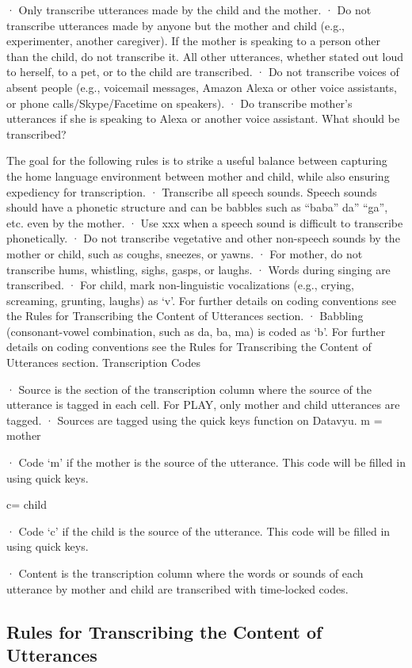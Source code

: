 \documentclass[
]{book}
\begin{document}
· Only transcribe utterances made by the child and the mother.
· Do not transcribe utterances made by anyone but the mother and child (e.g., experimenter, another caregiver). If the mother is speaking to a person other than the child, do not transcribe it. All other utterances, whether stated out loud to herself, to a pet, or to the child are transcribed.
· Do not transcribe voices of absent people (e.g., voicemail messages, Amazon Alexa or other voice assistants, or phone calls/Skype/Facetime on speakers).
· Do transcribe mother's utterances if she is speaking to Alexa or another voice assistant.
What should be transcribed?

The goal for the following rules is to strike a useful balance between capturing the home language environment between mother and child, while also ensuring expediency for transcription.
· Transcribe all speech sounds. Speech sounds should have a phonetic structure and can be babbles such as ``baba'' da'' ``ga'', etc. even by the mother.
· Use xxx when a speech sound is difficult to transcribe phonetically.
· Do not transcribe vegetative and other non-speech sounds by the mother or child, such as coughs, sneezes, or yawns.
· For mother, do not transcribe hums, whistling, sighs, gasps, or laughs.
· Words during singing are transcribed.
· For child, mark non-linguistic vocalizations (e.g., crying, screaming, grunting, laughs) as `v'. For further details on coding conventions see the Rules for Transcribing the Content of Utterances section.
· Babbling (consonant-vowel combination, such as da, ba, ma) is coded as `b'. For further details on coding conventions see the Rules for Transcribing the Content of Utterances section.
Transcription Codes

· Source is the section of the transcription column where the source of the utterance is tagged in each cell. For PLAY, only mother and child utterances are tagged.
· Sources are tagged using the quick keys function on Datavyu.
m = mother

· Code `m' if the mother is the source of the utterance. This code will be filled in using quick keys.

c= child

· Code `c' if the child is the source of the utterance. This code will be filled in using quick keys.

· Content is the transcription column where the words or sounds of each utterance by mother and child are transcribed with time-locked codes.

\hypertarget{rules-for-transcribing-the-content-of-utterances}{%
\subsection{Rules for Transcribing the Content of Utterances}\label{rules-for-transcribing-the-content-of-utterances}}
\end{document}
